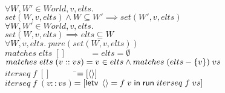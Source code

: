 \begin{tabbing}
$\forall W, W' \in World, v, elts.$ \\
\>$set(W,v,elts) \land W \subseteq W' \implies set(W',v, elts)$\\[1em]

$\forall W, W' \in World, v, elts.$ \\
\>$set(W, v, elts) \implies elts \subseteq W$ \\[1em]

$\forall W, v, elts.\; pure(set(W,v,elts))$ \\[1em]
  

$matches\;elts\;[] \qquad\;\;\; = elts = \emptyset$ \\
$matches\;elts\;(v :: vs) = v \in elts \land matches\;(elts - \{{v}\})\;vs$\\[1em]

$iterseq\; f\; [] \qquad\;\;\;\;$\=$= [\left<\right>]$ \\
$iterseq\; f\; (v :: vs)$\>$= [\mathsf{letv}\;\left<\right> = f\;v\;\mathsf{in}\;\mathsf{run}\;iterseq\;f\;vs]$ \\
\end{tabbing}



